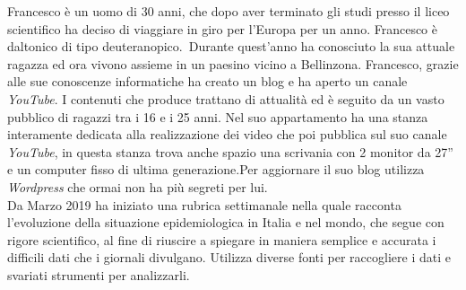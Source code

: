 Francesco è un uomo di 30 anni, che dopo aver terminato gli studi presso il liceo scientifico ha deciso di viaggiare in giro per l'Europa per un anno. Francesco è daltonico di tipo deuteranopico. Durante quest'anno ha conosciuto la sua attuale ragazza ed ora vivono assieme in un paesino vicino a Bellinzona. Francesco, grazie alle sue conoscenze informatiche ha creato un blog e ha aperto un canale \textit{YouTube}. I contenuti che produce trattano di attualità ed è seguito da un vasto pubblico di ragazzi tra i 16 e i 25 anni. Nel suo appartamento ha una stanza interamente dedicata alla realizzazione dei video che poi pubblica sul suo canale \textit{YouTube}, in questa stanza trova anche spazio una scrivania con 2 monitor da 27'' e un computer fisso di ultima generazione.Per aggiornare il suo blog utilizza \textit{Wordpress} che ormai non ha più segreti per lui.\\ 
Da Marzo 2019 ha iniziato una rubrica settimanale nella quale racconta l'evoluzione della situazione epidemiologica in Italia e nel mondo, che segue con rigore scientifico, al fine di riuscire a spiegare in maniera semplice e accurata i difficili dati che i giornali divulgano. Utilizza diverse fonti per raccogliere i dati e svariati strumenti per analizzarli. 

